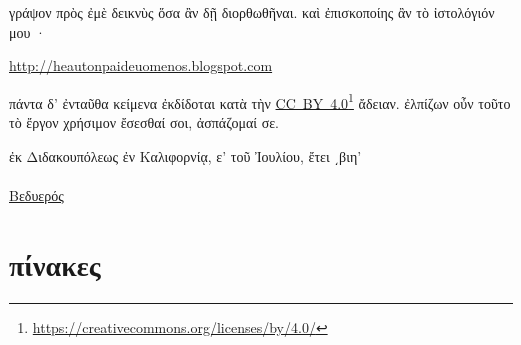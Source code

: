 \documentclass{book}
\begin{document}
γράψον πρὸς ἐμὲ δεικνὺς 
ὅσα ἂν δῇ διορθωθῆναι.
καὶ ἐπισκοποίης ἂν τὸ ἰστολόγιόν μου ·
\begin{flushleft}
\url{http://heautonpaideuomenos.blogspot.com}
\end{flushleft}
πάντα δ' ἐνταῦθα κείμενα ἐκδίδοται κατὰ τὴν
\href{https://creativecommons.org/licenses/by/4.0/}{CC~BY~4.0}\footnote{\url{https://creativecommons.org/licenses/by/4.0/}} ἄδειαν.
ἐλπίζων οὖν τοῦτο τὸ ἔργον χρήσιμον ἔσεσθαί σοι, ἀσπάζομαί σε.
\begin{flushright}
ἐκ Διδακουπόλεως ἐν Καλιφορνίᾳ, ε' τοῦ Ἰουλίου, ἔτει ͵βιη' \\
~\\
\href{mailto:bedwere@yahoo.com}{Βεδυερός} \\
\end{flushright}
\newpage
\chapter*{πίνακες}
\thispagestyle{empty}
\newpage
\pagestyle{fancy}
\fancyhead[RE,LO]{}
\renewcommand{\headrulewidth}{0pt}
\setcounter{page}{1} \raggedright
\end{document}
